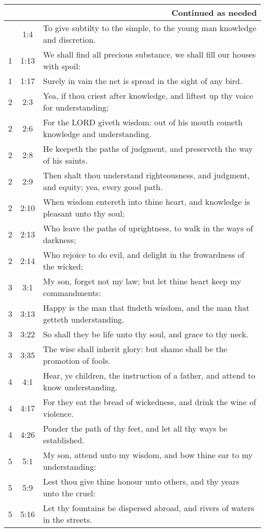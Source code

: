 \begin{center}
\begin{longtable}{c|c|p{3.5in}}
\hline \multicolumn{3}{|r|}{{Continued as needed}} \\ \hline
\endfoot 
1 & 1:4 & To give subtilty to the simple, to the young man knowledge and discretion.  \\ 
1 & 1:13 & We shall find all precious substance, we shall fill our houses with spoil:   \\ 
1 & 1:17 & Surely in vain the net is spread in the sight of any bird.  \\ \hline
2 & 2:3 &  Yea, if thou criest after knowledge, and liftest up thy voice for understanding; \\ 
2 & 2:6 & For the LORD giveth wisdom: out of his mouth cometh knowledge and understanding. \\ 
2 & 2:8 & He keepeth the paths of judgment, and preserveth the way of his saints. \\ 
2 & 2:9 & Then shalt thou understand righteousness, and judgment, and equity; yea, every good path. \\ 
2 & 2:10 & When wisdom entereth into thine heart, and knowledge is pleasant unto thy
soul; \\ 
2 & 2:13 & Who leave the paths of uprightness, to walk in the ways of darkness; \\ 
2 & 2:14 & Who rejoice to do evil, and delight in the frowardness of the wicked; \\ \hline
3 & 3:1 & My son, forget not my law; but let thine heart keep my commandments: \\ 
3 & 3:13 & Happy is the man that findeth wisdom, and the man that getteth understanding. \\ 
3 & 3:22 &  So shall they be life unto thy soul, and grace to thy neck. \\ 
3 & 3:35 & The wise shall inherit glory: but shame shall be the promotion of fools. \\ \hline
4 & 4:1 & Hear,  ye children, the instruction of a father, and attend to know understanding. \\ 
4 & 4:17 & For they eat the bread of wickedness, and drink the wine of violence. \\ 
4 & 4:26 &  Ponder the path of thy feet, and let all thy ways be established. \\  \hline
5 & 5:1  & My son, attend unto my wisdom, and bow thine ear to my understanding: \\ 
5 & 5:9  & Lest thou give thine honour unto others, and thy years unto the cruel: \\ 
5 & 5:16  & Let thy fountains be dispersed abroad, and rivers of waters in the streets. \\ 

\end{longtable}
\end{center}
